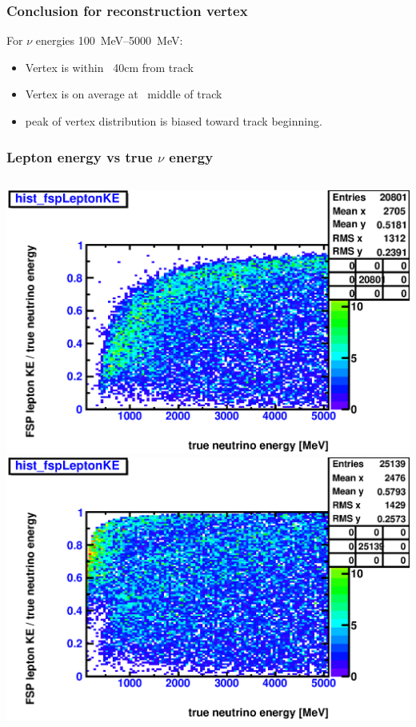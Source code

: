 \documentclass{beamer}
\begin{document}
\begin{frame}
	\frametitle{Conclusion for reconstruction vertex}
	For $\nu$ energies \SIrange{100}{5000}{MeV}:
	\begin{itemize}
		\item Vertex is within ~40cm from track
		\item Vertex is on average at ~middle of track
		\item peak of vertex distribution is biased toward track beginning.
	\end{itemize}
\end{frame}

\begin{frame}
	\frametitle{Lepton energy vs true $\nu$ energy}
	\begin{columns}[t]
		\includegraphics[width=1.0\textwidth]{nue_H1_fspLeptonVSTrueNuEnergy_onlyCC_maxR600cm.eps}
		\includegraphics[width=1.0\textwidth]{nue_C12_fspLeptonVSTrueNuEnergy_onlyCC_maxR600cm.eps}
	\end{columns}
\end{frame}
\end{document}
